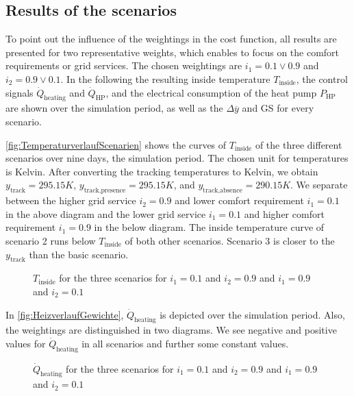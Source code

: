 \subsection{Results of the scenarios}
\label{subsec:Results of the scenarios}
To point out the influence of the weightings in the cost function, all results are presented for two representative weights, which enables to focus on the comfort requirements or grid services. The chosen weightings are $i_\text{1} = 0.1 \vee 0.9$ and $i_\text{2} = 0.9 \vee 0.1$. In the following the resulting inside temperature $T_\text{inside}$, the control signals  $\dot{Q}_\text{heating}$ and $\dot{Q}_\text{HP}$, and the electrical consumption of the heat pump $P_\text{HP}$ are shown over the simulation period, as well as the $\Delta \overline{y}$ and GS for every scenario.\newline

\autoref{fig:TemperaturverlaufScenarien} shows the curves of $T_\text{inside}$ of the three different scenarios over nine days, the simulation period. The chosen unit for temperatures is Kelvin. After converting  the tracking temperatures to Kelvin, we obtain $y_\text{track} = 295.15 K$, $y_\text{track,presence} = 295.15 K$, and $y_\text{track,absence} = 290.15 K$. We separate between the higher grid service $i_\text{2} = 0.9$ and lower comfort requirement $i_\text{1} = 0.1$ in the above diagram and the lower grid service $i_\text{1} = 0.1$ and higher comfort requirement $i_\text{1} = 0.9$ in the below diagram.\newline 
The inside temperature curve of scenario 2 runs below $T_\text{inside}$ of both other scenarios. Scenario 3 is closer to the $y_\text{track}$ than the basic scenario. 
    \begin{figure}[H]
           \centering
        \def\svgwidth{1\textwidth}
        
        \caption{$T_\text{inside}$ for the three scenarios for $i_\text{1} = 0.1$ and $i_\text{2} = 0.9$ and $i_\text{1} = 0.9$ and $i_\text{2} = 0.1$}
         \label{fig:TemperaturverlaufScenarien}
    \end{figure}
 
In \autoref{fig:HeizverlaufGewichte}, $\dot{Q}_\text{heating}$ is depicted over the simulation period. Also, the weightings are distinguished in two diagrams. We see negative and positive values for $\dot{Q}_\text{heating}$ in all scenarios and further some constant values.
     \begin{figure}[H]
           \centering
        \def\svgwidth{1.05\textwidth}
        
        \caption{$\dot{Q}_\text{heating}$ for the three scenarios for $i_\text{1} = 0.1$ and $i_\text{2} = 0.9$ and $i_\text{1} = 0.9$ and $i_\text{2} = 0.1$}
         \label{fig:HeizverlaufGewichte}
    \end{figure}
    
